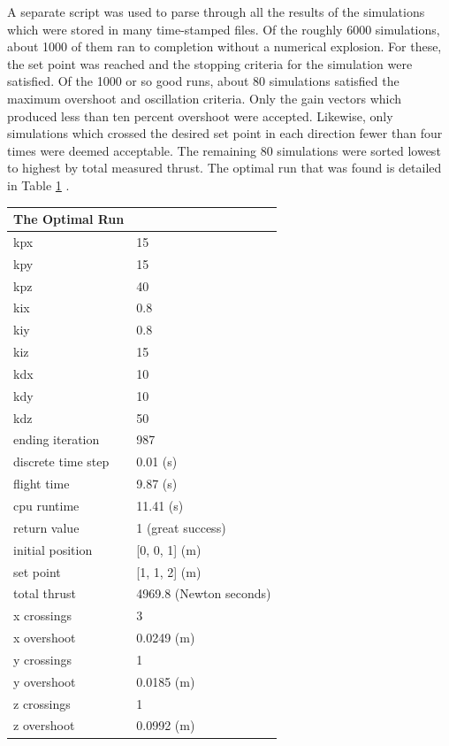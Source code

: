 A separate script was used to parse through all the results of the simulations which were stored in many time-stamped files. Of the roughly 6000 simulations, about 1000 of them ran to completion without a numerical explosion. For these, the set point was reached and the stopping criteria for the simulation were satisfied. Of the 1000 or so good runs, about 80 simulations satisfied the maximum overshoot and oscillation criteria. Only the gain vectors which produced less than ten percent overshoot were accepted. Likewise, only simulations which crossed the desired set point in each direction fewer than four times were deemed acceptable. The remaining 80 simulations were sorted lowest to highest by total measured thrust. The optimal run that was found is detailed in Table \ref{table:optimalrun} .   


\begin{table}\label{table:optimalrun}
\begin{doublespace}
\centering
\begin{tabular}{l l}
The Optimal Run      \\
\hline                        
kpx                 & 15 \\
kpy                 & 15 \\
kpz                 & 40 \\
kix                 & 0.8 \\
kiy                 & 0.8 \\
kiz                 & 15 \\
kdx                 & 10 \\
kdy                 & 10 \\
kdz                 & 50 \\
ending iteration    & 987 \\
discrete time step   & 0.01 (s)\\
flight time         & 9.87 (s) \\
cpu runtime         & 11.41 (s)\\
return value        & 1 (great success)\\
initial position    & [0, 0, 1] (m)\\
set point           & [1, 1, 2] (m) \\
total thrust        & 4969.8 (Newton seconds) \\
x crossings         & 3 \\
x overshoot         & 0.0249 (m) \\
y crossings         & 1 \\
y overshoot         & 0.0185 (m)\\
z crossings         & 1 \\
z overshoot         & 0.0992 (m) \\
\end{tabular}
\end{doublespace}
\end{table}

